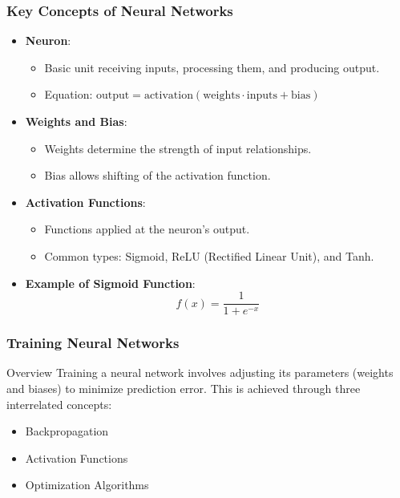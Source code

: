 \documentclass[aspectratio=169]{beamer}
\begin{document}
\begin{frame}[fragile]
    \frametitle{Key Concepts of Neural Networks}
    \begin{itemize}
        \item \textbf{Neuron}:
        \begin{itemize}
            \item Basic unit receiving inputs, processing them, and producing output.
            \item Equation: \( \text{output} = \text{activation}(\text{weights} \cdot \text{inputs} + \text{bias}) \)
        \end{itemize}
        
        \item \textbf{Weights and Bias}:
        \begin{itemize}
            \item Weights determine the strength of input relationships.
            \item Bias allows shifting of the activation function.
        \end{itemize}
        
        \item \textbf{Activation Functions}:
        \begin{itemize}
            \item Functions applied at the neuron's output.
            \item Common types: Sigmoid, ReLU (Rectified Linear Unit), and Tanh.
        \end{itemize}
        
        \item \textbf{Example of Sigmoid Function}:
        \begin{equation}
            f(x) = \frac{1}{1 + e^{-x}}
        \end{equation}
    \end{itemize}
\end{frame}

\begin{frame}[fragile]
    \frametitle{Training Neural Networks}
    \begin{block}{Overview}
        Training a neural network involves adjusting its parameters (weights and biases) to minimize prediction error. This is achieved through three interrelated concepts:
        \begin{itemize}
            \item Backpropagation
            \item Activation Functions
            \item Optimization Algorithms
        \end{itemize}
    \end{block}
\end{frame}
\end{document}
